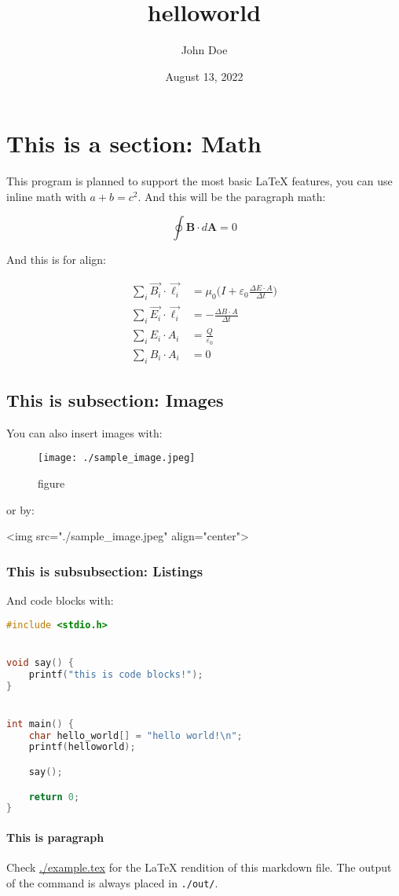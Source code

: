\documentclass[12pt]{article}
\title{helloworld}
\author{John Doe}
\date{August 13, 2022}
\begin{document}
	
	\section{This is a section: Math}
	
	This program is planned to support the most basic LaTeX features, you can use inline math with $a + b = c^2$. And this will be the paragraph math:
	
	\begin{equation}
		\oint \boldsymbol{B} \cdot d \boldsymbol{A} = 0
	\end{equation}
	
	And this is for align:
	
	\begin{align}
		\sum_{i} \vec{B_{i}} \cdot \vec{\ell_{i}} &= \mu_{0} \bigg(I + \varepsilon_{0} \frac{\Delta E \cdot A}{\Delta t} \bigg)\\
		\sum_{i} \vec{E_{i}} \cdot \vec{\ell_{i}} &= - \frac{\Delta B \cdot A}{\Delta t}\\
		\sum_{i} E_{i} \cdot A_{i} &= \frac{Q}{\varepsilon_{0}}\\
		\sum_{i} B_{i} \cdot A_{i} &= 0
	\end{align}
	
	\subsection{This is subsection: Images}
	
	You can also insert images with:
	
	\begin{figure}[h]
		\texttt{[image: ./sample\_image.jpeg]}
		\caption{figure}
	\end{figure}
	
	or by:
	
	
	<img src="./sample\_image.jpeg" align="center">
	
	
	\subsubsection{This is subsubsection: Listings}
	
	And code blocks with:
	
	
\begin{lstlisting}[language=c]
#include <stdio.h>


void say() {
    printf("this is code blocks!");
}


int main() {
    char hello_world[] = "hello world!\n";
    printf(helloworld);

    say();

    return 0;
}
\end{lstlisting}
	
	\paragraph{This is paragraph}
	
	Check \href{example.tex}{./example.tex} for the LaTeX rendition of this markdown file. The output of the command is always placed in \texttt{./out/}.
	
\end{document}

